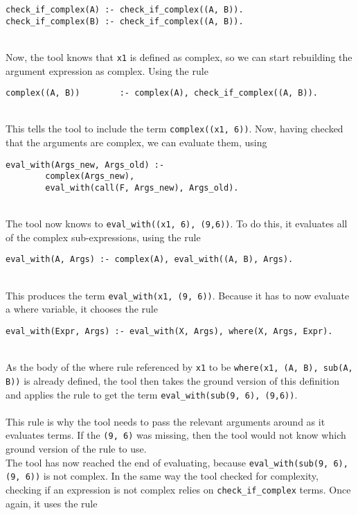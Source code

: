 \begin{lstlisting}[firstnumber=152]
check_if_complex(A) :- check_if_complex((A, B)).
check_if_complex(B) :- check_if_complex((A, B)).
\end{lstlisting}
\mbox{} \\
Now, the tool knows that \lstinline!x1! is defined as complex, so we can start rebuilding the argument expression as complex. Using the rule  \\

\begin{lstlisting}[firstnumber=163]
complex((A, B))        :- complex(A), check_if_complex((A, B)).
\end{lstlisting}
\mbox{} \\
This tells the tool to include the term \lstinline!complex((x1, 6))!. Now, having checked that the arguments are complex, we can evaluate them, using \\

\begin{lstlisting}[firstnumber=135]
eval_with(Args_new, Args_old) :- 
		complex(Args_new), 
		eval_with(call(F, Args_new), Args_old).
\end{lstlisting}
\mbox{} \\
The tool now knows to \lstinline!eval_with((x1, 6), (9,6))!. To do this, it evaluates all of the complex sub-expressions, using the rule \\ 

\begin{lstlisting}[firstnumber=139]
eval_with(A, Args) :- complex(A), eval_with((A, B), Args).
\end{lstlisting}
\mbox{} \\
This produces the term \lstinline{eval_with(x1, (9, 6))}. Because it has to now evaluate a where variable, it chooses the rule \\ %

\begin{lstlisting}[firstnumber=133]
eval_with(Expr, Args) :- eval_with(X, Args), where(X, Args, Expr).
\end{lstlisting}
\mbox{} \\
As the body of the where rule referenced by \lstinline{x1} to be \lstinline{where(x1, (A, B), sub(A, B))} is already defined, the tool then takes the ground version of this definition and applies the rule to get the term \lstinline{eval_with(sub(9, 6), (9,6))}. \\ \\%
This rule is why the tool needs to pass the relevant arguments around as it evaluates terms. If the \lstinline{(9, 6)} was missing, then the tool would not know which ground version of the rule to use.\\ %
The tool has now reached the end of evaluating, because \lstinline{eval_with(sub(9, 6), (9, 6))} is not complex. In the same way the tool checked for complexity, checking if an expression is not complex relies on \lstinline{check_if_complex} terms. Once again, it uses the rule\\

